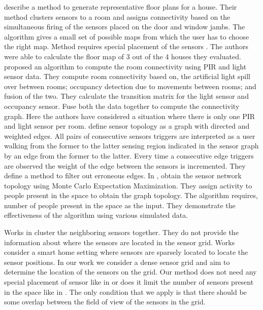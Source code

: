 \citeauthor{Lu:2014:SBS:2648771.2629441}\cite{Lu:2014:SBS:2648771.2629441} describe a method to generate representative floor plans for a house. Their method clusters sensors to a room and assigns connectivity based on the simultaneous firing of the sensors placed on the door and window jambs. The algorithm gives a small set of possible maps from which the user has to choose the right map. Method requires special placement of the sensors . The authors were able to calculate the floor map of 3 out of the 4 houses they evaluated.  
 \citeauthor{ellis2012creating}\cite{ellis2012creating} proposed an algorithm to compute the room connectivity using  PIR and light sensor data. They compute room connectivity based on, the artificial light spill over between rooms; occupancy detection due to movements between
  rooms; and fusion of the two. They calculate the transition matrix for the light sensor and occupancy sensor. Fuse both the data together to compute the connectivity graph. Here the authors have considered a situation where there is only one PIR and light sensor per room.
\citeauthor{muller2014automated}\cite{muller2014automated} define  sensor topology as a graph with directed and weighted edges. All pairs of consecutive sensors triggers are interpreted as a user walking from the former to the latter sensing region indicated in the sensor 
graph by an edge from the former to the latter. Every time a consecutive edge triggers are observed the weight of the edge between the sensors is incremented. They define a method to filter out erroneous edges.
In \cite{marinakis2005learning}, \citeauthor{marinakis2005learning} obtain the sensor network topology using Monte Carlo Expectation Maximization. They assign activity to people present in the space to obtain the graph topology. The algorithm requires, number of people present in the space as the input. They demonstrate the effectiveness of the algorithm using various simulated data. 

Works in \cite{Hong:2013:TAS:2528282.2528302,doi:10.1061/9780784413616.226,Koc:2014:CLC:2674061.2674075} cluster the neighboring sensors together. They do not provide the information about where the sensors are located in the sensor grid. Works \cite{ellis2012creating,Lu:2014:SBS:2648771.2629441,muller2014automated} consider a smart home setting where sensors are sparsely located to locate the sensor positions. In our work we consider a dense sensor grid and aim to determine the location of the sensors on the grid. Our method does not need any special placement of sensor like in \cite{Lu:2014:SBS:2648771.2629441} or does it limit the number of sensors present in the space like in \cite{ellis2012creating}.  The only condition that we apply is that there should be some overlap between the field of view of the sensors in the grid.





